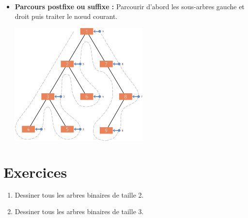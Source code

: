 \documentclass[10pt,firamath,cours]{nsi}
\begin{document}
\begin{itemize}
    \item  \textbf{Parcours postfixe ou suffixe :} Parcourir d'abord les sous-arbres gauche et droit puis traiter le n\oe ud courant.\\
          \begin{center}
              \includegraphics[width=7cm]{img/suffixe.png}
          \end{center}
\end{itemize}
\section{Exercices}

\begin{exercice}
    \begin{enumerate}
        \item   Dessiner tous les arbres binaires de taille 2.
        \item   Dessiner tous les arbres binaires de taille 3.
    \end{enumerate}
\end{exercice}
\end{document}
